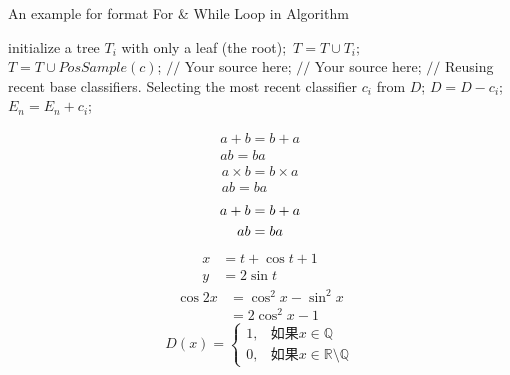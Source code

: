 \documentclass[12pt]{article}
\begin{document}
\begin{algorithm}[h]
    \caption{An example for format For \& While Loop in Algorithm}
    \label{alg:4}
    \begin{algorithmic}[1]
            \STATE initialize a tree $T_{i}$ with only a leaf (the root);\
            \STATE $T=T \cup T_{i};$\
        \ENDFOR
            \STATE $T=T \cup PosSample(c)$;
        \ENDFOR
            \STATE $//$ Your source here;
        \ENDFOR
            \STATE $//$ Your source here;
        \ENDFOR
            \STATE $//$ Reusing recent base classifiers.
            \STATE Selecting the most recent classifier $c_i$ from $D$;
            \STATE $D=D-c_i$;
            \STATE $E_n=E_n+c_i$;
        \ENDWHILE
    \end{algorithmic}
\end{algorithm}
\clearpage
\begin{gather}%
	a+b=b+a\\
	ab=ba
\end{gather}
\begin{gather*}%
a \times b=b \times a\\
ab=ba   
\end{gather*}
\begin{gather}%
a+b=b+a \notag \\%
ab=ba   \notag %
\end{gather}
\begin{align}
	x &= t + \cos t + 1\\
	y &= 2\sin t
\end{align}
\begin{equation}
	\begin{split}
	\cos 2x &= \cos^2 x - \sin^2 x\\
	&= 2\cos^2 x - 1
	\end{split}
\end{equation}
\begin{equation}
	D(x) = \begin{cases}
	1, &\text{如果} x \in \mathbb{Q}\\%
	0, &\text{如果} x \in \mathbb{R}\setminus\mathbb{Q}	
		   \end{cases}%
\end{equation}
\end{document}
